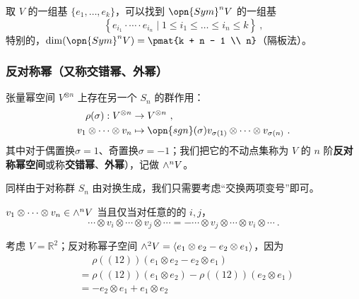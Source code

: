 取 $V$ 的一组基 $\{e_1, \dots, e_k\}$，可以找到 $\opn{Sym}^n V$ 的一组基
\begin{equation}
\left\{ e_{i_1} \cdot \cdots \cdot e_{i_n} \mid 1 \leq i_1 \leq \dots \leq i_n \leq k \right\}~,
\end{equation}
特别的，$\dim(\opn{Sym}^n V) = \pmat{k + n - 1 \\ n}$（隔板法）。

\subsubsection{反对称幂（又称交错幂、外幂）}

张量幂空间 $V^{\otimes n}$ 上存在另一个 $S_n$ 的群作用：
\begin{equation}
\begin{aligned}
\rho(\sigma): V^{\otimes n} &\to V^{\otimes n}~, \\
v_1 \otimes \cdots \otimes v_n &\mapsto \opn{sgn}(\sigma) v_{\sigma(1)} \otimes \cdots \otimes v_{\sigma(n)}~.
\end{aligned}
\end{equation}
其中对于偶置换$\sigma = 1$、奇置换$\sigma = -1$；我们把它的不动点集称为 $V$ 的 $n$ 阶\textbf{反对称幂空间}或称\textbf{交错幂}、\textbf{外幂}），记做 ${\large \wedge}^n V$。

同样由于对称群 $S_n$ 由对换生成，我们只需要考虑“交换两项变号”即可。
\begin{theorem}{}
$v_1 \otimes \cdots \otimes v_n \in {\large \wedge}^n V$ 当且仅当对任意的的 $i, j$，
\begin{equation}
\cdots \otimes v_i \otimes \cdots \otimes v_j \otimes \cdots = - \cdots \otimes v_j \otimes \cdots \otimes v_i \otimes \cdots~.
\end{equation}
\end{theorem}


\begin{example}{}\label{ex_vecSAS_2}
考虑 $V = \mathbb{R}^2$；反对称幂子空间 ${\large \wedge}^2 V = \langle e_1 \otimes e_2 - e_2 \otimes e_1 \rangle$，因为
\begin{equation}
\begin{aligned}
&\phantom{=} \rho((1 2))(e_1 \otimes e_2 - e_2 \otimes e_1) \\
&= \rho((1 2))(e_1 \otimes e_2) - \rho((1 2))(e_2 \otimes e_1) \\
&= - e_2 \otimes e_1 + e_1 \otimes e_2
\end{aligned}~
\end{equation}
\end{example}

